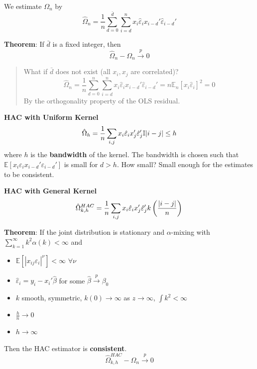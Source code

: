\documentclass[12pt,]{book}
\providecommand{\tightlist}{%
  \setlength{\itemsep}{0pt}\setlength{\parskip}{0pt}}
\begin{document}
We estimate \(\Omega_n\) by
\[
    \hat{\Omega}_n = \frac{1}{n} \sum _ {d=0}^{\bar{d}} \sum _ {i = d}^{n} x_i \hat{\varepsilon}_i x _ {i-d}' \hat{\varepsilon} _ {i-d}'
\]

\textbf{Theorem}:
If \(\bar{d}\) is a fixed integer, then
\[
    \hat{\Omega}_n - \Omega_n \overset{p}{\to} 0
\]

\begin{quote}
What if \(\bar{d}\) does not exist (all \(x_i, x_j\) are correlated)?
\[
\hat{\Omega}_n = \frac{1}{n} \sum _ {d=0}^{n} \sum _ {i = d}^{n} x_i \hat{\varepsilon}_i x _ {i-d}' \hat{\varepsilon} _ {i-d}' = n \mathbb E_n[x_i \hat{\varepsilon}_i]^2 = 0
\]
By the orthogonality property of the OLS residual.
\end{quote}

\textbf{HAC with Uniform Kernel}
\[
    \hat{\Omega}_h = \frac{1}{n} \sum _ {i,j} x_i \hat{\varepsilon}_i x_j' \hat{\varepsilon}_j' \mathbb{I} \\{ |i-j| \leq h\\}  
\]
where \(h\) is the \textbf{bandwidth} of the kernel. The bandwidth is chosen such that \(\mathbb E[x_i \varepsilon_i x _ {i-d}' \varepsilon _ {i-d}' ]\) is small for \(d > h\). How small? Small enough for the estimates to be consistent.

\textbf{HAC with General Kernel}
\[
\hat{\Omega}^{HAC} _ {k,h} = \frac{1}{n} \sum _ {i,j} x_i \hat{\varepsilon}_i x_j' \hat{\varepsilon}_j' k \left( \frac{|i-j|}{n} \right) \\
\]

\textbf{Theorem}:
If the joint distribution is stationary and \(\alpha\)-mixing with \(\sum _ {k=1}^\infty k^2 \alpha(k) < \infty\) and

\begin{itemize}
\tightlist
\item
  \(\mathbb E[ | x _ {ij} \varepsilon_i |^\nu ] < \infty\) \(\forall \nu\)
\item
  \(\hat{\varepsilon}_i = y_i - x_i' \hat \beta\) for some \(\hat \beta \overset{p}{\to} \beta_0\)
\item
  \(k\) smooth, symmetric, \(k(0) \to \infty\) as \(z \to \infty\), \(\int k^2 < \infty\)
\item
  \(\frac{h}{n} \to 0\)
\item
  \(h \to \infty\)
\end{itemize}

Then the HAC estimator is \textbf{consistent}.
\[
    \hat{\Omega}^{HAC} _ {k,h} - \Omega_n \overset{p}{\to} 0
\]
\end{document}
